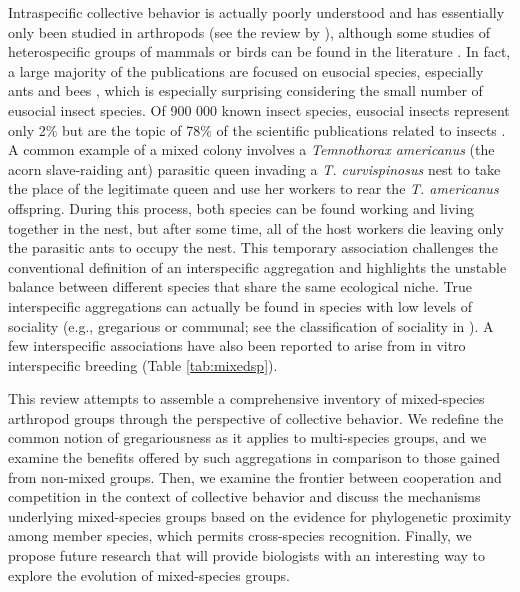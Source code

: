 Intraspecific collective behavior is actually poorly understood and has essentially only been studied in arthropods (see the review by \citet{jeanson_key_2012}), although some studies of heterospecific groups of mammals or birds can be found in the literature \citep{terborgh_mixed_1990,stensland_mixed_2003}. In fact, a large majority of the publications are focused on eusocial species, especially ants and bees \citep{wilson_insect_1971,krause_living_2002,sumpter_collective_2009}, which is especially surprising considering the small number of eusocial insect species. Of 900 000 known insect species, eusocial insects represent only 2$\%$ but are the topic of 78$\%$ of the scientific publications related to insects \citep{costa_social_2005,wilson_eusociality:_2005}. A common example of a mixed colony involves a \textit{Temnothorax americanus} (the acorn slave-raiding ant) parasitic queen invading a \textit{T. curvispinosus} nest to take the place of the legitimate queen and use her workers to rear the \textit{T. americanus} offspring. During this process, both species can be found working and living together in the nest, but after some time, all of the host workers die leaving only the parasitic ants to occupy the nest. This temporary association challenges the conventional definition of an interspecific aggregation and highlights the unstable balance between different species that share the same ecological niche. True interspecific aggregations can actually be found in species with low levels of sociality (e.g., gregarious or communal; see the classification of sociality in \citet{wilson_insect_1971}). A few interspecific associations have also been reported to arise from in vitro interspecific breeding \citep{fielde_artificial_1903,errard_development_1994,vauchot_regulation_1996} (Table \ref{tab:mixedsp}).

This review attempts to assemble a comprehensive inventory of mixed-species arthropod groups through the perspective of collective behavior. We redefine the common notion of gregariousness as it applies to multi-species groups, and we examine the benefits offered by such aggregations in comparison to those gained from non-mixed groups. Then, we examine the frontier between cooperation and competition in the context of collective behavior and discuss the mechanisms underlying mixed-species groups based on the evidence for phylogenetic proximity among member species, which permits cross-species recognition. Finally, we propose future research that will provide biologists with an interesting way to explore the evolution of mixed-species groups.


